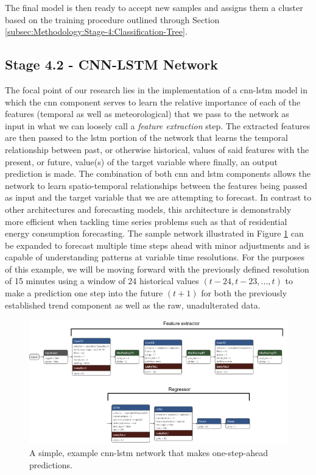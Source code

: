\noindent \newline The final model is then ready to accept new samples and assigns them a cluster based on the training procedure outlined through Section \ref{subsec:Methodology:Stage-4:Classification-Tree}.

\subsection{Stage 4.2 - CNN-LSTM Network}
\label{subsec:Methodology:Stage-4:CNN-LSTM-Network}
The focal point of our research lies in the implementation of  a \gls{cnn-lstm} model in which the \gls{cnn} component serves to learn the relative importance of each of the features (temporal as well as meteorological) that we pass to the network as input in what we can loosely call a \textit{feature extraction} step. The extracted features are then passed to the \gls{lstm} portion of the network that learns the temporal relationship between past, or otherwise historical, values of said features with the present, or future, value(s) of the target variable where finally, an output prediction is made. The combination of both \gls{cnn} and \gls{lstm} components allows the network to learn spatio-temporal relationships between the features being passed as input and the target variable that we are attempting to forecast. In contrast to other architectures and forecasting models, this architecture is demonstrably more efficient \cite{Kim} when tackling time series problems such as that of residential energy consumption forecasting. The sample network illustrated in Figure \ref{fig:UCID-CNN-LSTM-Model} can be expanded to forecast multiple time steps ahead with minor adjustments and is capable of understanding patterns at variable time resolutions. For the purposes of this example, we will be moving forward with the previously defined resolution of 15 minutes using a window of 24 historical values $(t - 24, t - 23, ..., t)$ to make a prediction one step into the future $(t + 1)$ for both the previously established trend component as well as the raw, unadulterated data.

\begin{figure}[hbt!]
    \begin{adjustwidth}{-1.5cm}{-1.5cm}%
        \centering
        \includegraphics[width=\linewidth]{Images/Chapter 5/Stage 4/UCID/UCID-CNN-LSTM-Model-2.pdf}
        \caption{A simple, example \gls{cnn-lstm} network that makes one-step-ahead predictions.}
        \label{fig:UCID-CNN-LSTM-Model}
    \end{adjustwidth}
\end{figure}

